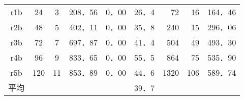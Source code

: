 \documentclass[a4j，11pt，twocolumn]{jsarticle}
\begin{document}
\begin{table*}
\begin{tabular}{cccrrrrrr}
r1b                  & 24                   & 3                    & 208．56                    & 0．00                      & 26．4                        & 72                                                                       & 16                       & 164．46                      \\
r2b                  & 48                   & 5                    & 402．11                    & 0．00                      & 35．8                        & 240                                                                      & 15                       & 296．06                      \\
r3b                  & 72                   & 7                    & 697．87                    & 0．00                      & 41．4                        & 504                                                                      & 49                       & 493．30                      \\
r4b                  & 96                   & 9                    & 833．65                    & 0．00                      & 55．5                        & 864                                                                      & 75                       & 535．90                      \\
r5b                  & 120                  & 11                   & 853．89                    & 0．00                      & 44．6                        & 1320                                                                     & 106                      & 589．74                      \\ \hline
平均                   & \multicolumn{1}{l}{} & \multicolumn{1}{l}{} &                           &                           & 39．7                        &                                                                          &                          &                             \\ \hline
\end{tabular}
\end{table*}
\end{document}
